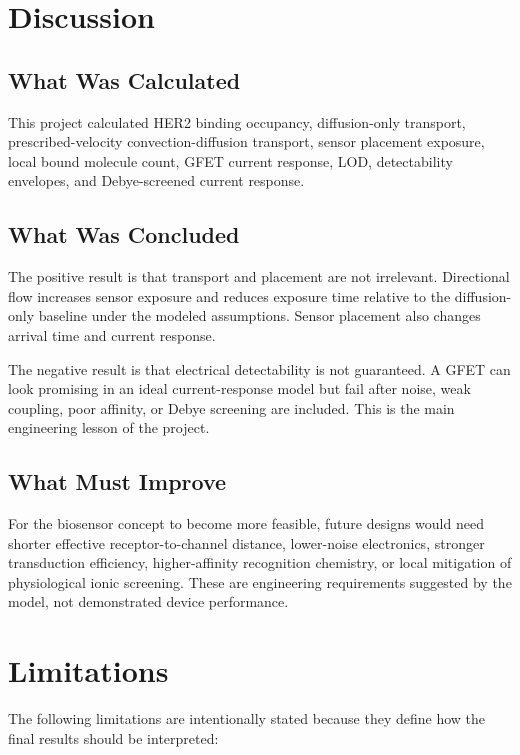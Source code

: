 \documentclass[12pt,a4paper,oneside]{report}
\begin{document}
\chapter{Discussion}

\section{What Was Calculated}

This project calculated HER2 binding occupancy, diffusion-only transport, prescribed-velocity convection-diffusion transport, sensor placement exposure, local bound molecule count, GFET current response, LOD, detectability envelopes, and Debye-screened current response.

\section{What Was Concluded}

The positive result is that transport and placement are not irrelevant. Directional flow increases sensor exposure and reduces exposure time relative to the diffusion-only baseline under the modeled assumptions. Sensor placement also changes arrival time and current response.

The negative result is that electrical detectability is not guaranteed. A GFET can look promising in an ideal current-response model but fail after noise, weak coupling, poor affinity, or Debye screening are included. This is the main engineering lesson of the project.

\section{What Must Improve}

For the biosensor concept to become more feasible, future designs would need shorter effective receptor-to-channel distance, lower-noise electronics, stronger transduction efficiency, higher-affinity recognition chemistry, or local mitigation of physiological ionic screening. These are engineering requirements suggested by the model, not demonstrated device performance.

\chapter{Limitations}

The following limitations are intentionally stated because they define how the final results should be interpreted:
\end{document}
